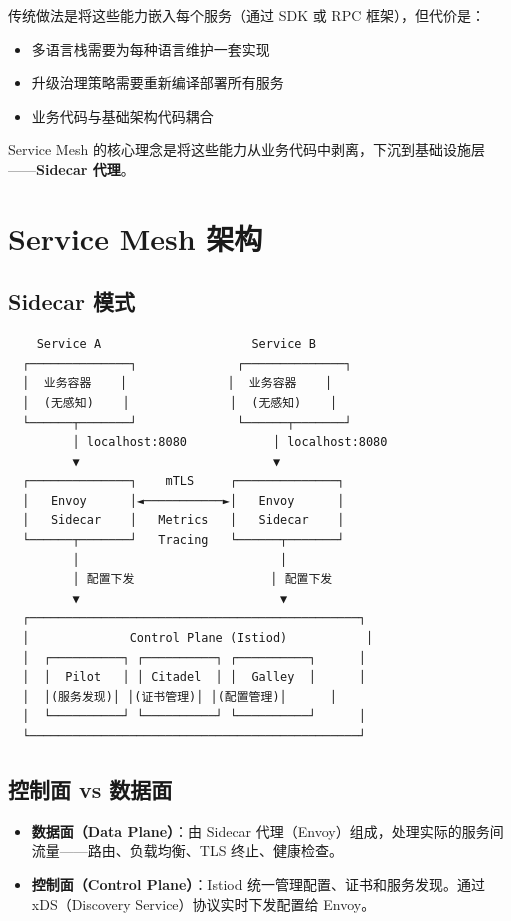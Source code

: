 \documentclass[12pt,UTF8]{ctexbook}
\begin{document}
传统做法是将这些能力嵌入每个服务（通过 SDK 或 RPC 框架），但代价是：
\begin{itemize}
    \item 多语言栈需要为每种语言维护一套实现
    \item 升级治理策略需要重新编译部署所有服务
    \item 业务代码与基础架构代码耦合
\end{itemize}

Service Mesh 的核心理念是将这些能力从业务代码中剥离，下沉到基础设施层——\textbf{Sidecar 代理}。

\section{Service Mesh 架构}
\label{sec:mesh-arch}

\subsection*{Sidecar 模式}

\begin{lstlisting}
    Service A                     Service B
  ┌──────────────┐              ┌──────────────┐
  │  业务容器    │              │  业务容器    │
  │  (无感知)    │              │  (无感知)    │
  └──────┬───────┘              └──────┬───────┘
         │ localhost:8080            │ localhost:8080
         ▼                           ▼
  ┌──────────────┐    mTLS     ┌──────────────┐
  │   Envoy      │◄───────────►│   Envoy      │
  │   Sidecar    │   Metrics   │   Sidecar    │
  └──────┬───────┘   Tracing   └──────┬───────┘
         │                            │
         │ 配置下发                   │ 配置下发
         ▼                            ▼
  ┌──────────────────────────────────────────────┐
  │              Control Plane (Istiod)           │
  │  ┌──────────┐ ┌──────────┐ ┌──────────┐      │
  │  │  Pilot   │ │ Citadel  │ │  Galley  │      │
  │  │(服务发现)│ │(证书管理)│ │(配置管理)│      │
  │  └──────────┘ └──────────┘ └──────────┘      │
  └──────────────────────────────────────────────┘
\end{lstlisting}

\subsection*{控制面 vs 数据面}

\begin{itemize}
    \item \textbf{数据面（Data Plane）}：由 Sidecar 代理（Envoy）组成，处理实际的服务间流量——路由、负载均衡、TLS 终止、健康检查。
    \item \textbf{控制面（Control Plane）}：Istiod 统一管理配置、证书和服务发现。通过 xDS（Discovery Service）协议实时下发配置给 Envoy。
\end{itemize}
\end{document}
